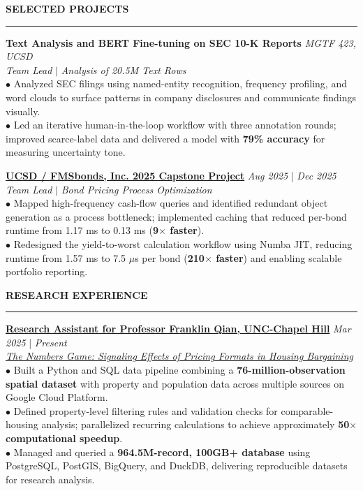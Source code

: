 \documentclass{../original_CV/resume}
\renewcommand{\sectionskip}{\vspace{0.10cm}}
\renewcommand{\sectionlineskip}{\vspace{0.10cm}}
\renewenvironment{rSection}[1]{
\sectionskip
\textcolor{UC San Diego Blue}{\textbf{\large\bfseries\MakeUppercase{#1}}}
\sectionlineskip
\hrule
\begin{list}{}{
\setlength{\leftmargin}{0em}
}
\item[]
}{
\end{list}
}
\begin{document}
\newpage
\begin{rSection}{SELECTED PROJECTS}
\noindent
\textbf{Text Analysis and BERT Fine-tuning on SEC 10-K Reports} \hfill \textit{MGTF 423, UCSD}\\
\textit{Team Lead} $|$ \textit{Analysis of 20.5M Text Rows}\\[4pt]
$\bullet$ Analyzed SEC filings using named-entity recognition, frequency profiling, and word clouds to surface patterns in company disclosures and communicate findings visually.\\[1.5pt]
$\bullet$ Led an iterative human-in-the-loop workflow with three annotation rounds; improved scarce-label data and delivered a model with \textbf{79\% accuracy} for measuring uncertainty tone.

\noindent
\href{https://github.com/YuankaiTao-super/Capstone_FMS_2025}{\textbf{UCSD / FMSbonds, Inc. 2025 Capstone Project}} \hfill {\em Aug 2025} | {\em Dec 2025}\\
\textit{Team Lead} $|$ \textit{Bond Pricing Process Optimization}\\[4pt]
$\bullet$ Mapped high-frequency cash-flow queries and identified redundant object generation as a process bottleneck; implemented caching that reduced per-bond runtime from 1.17 ms to 0.13 ms (\textbf{9$\times$ faster}).\\[1.5pt]
$\bullet$ Redesigned the yield-to-worst calculation workflow using Numba JIT, reducing runtime from 1.57 ms to 7.5 $\mu$s per bond (\textbf{210$\times$ faster}) and enabling scalable portfolio reporting.
\end{rSection}

\begin{rSection}{RESEARCH EXPERIENCE}
\noindent
\textbf{\href{https://github.com/YuankaiTao-super/Construction-of-Comparable-Housing-Variables}{Research Assistant for Professor Franklin Qian, UNC-Chapel Hill}} \hfill {\em Mar 2025} | {\em Present}\\
\textit{\href{https://papers.ssrn.com/sol3/papers.cfm?abstract_id=4406954}{The Numbers Game: Signaling Effects of Pricing Formats in Housing Bargaining}}\\[4pt]
$\bullet$ Built a Python and SQL data pipeline combining a \textbf{76-million-observation spatial dataset} with property and population data across multiple sources on Google Cloud Platform.\\[1.5pt]
$\bullet$ Defined property-level filtering rules and validation checks for comparable-housing analysis; parallelized recurring calculations to achieve approximately \textbf{50$\times$ computational speedup}.\\[1.5pt]
$\bullet$ Managed and queried a \textbf{964.5M-record, 100GB+ database} using PostgreSQL, PostGIS, BigQuery, and DuckDB, delivering reproducible datasets for research analysis.
\end{rSection}
\end{document}
